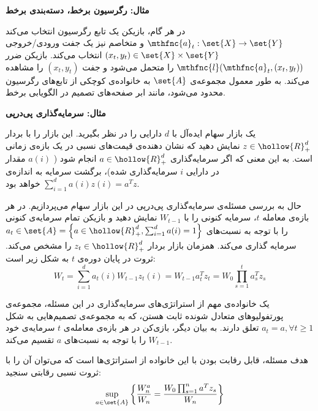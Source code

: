 {\bf
مثال: رگرسیون برخط، دسته‌بندی
برخط
} 

در هر گام، بازیکن یک تابع رگرسیون انتخاب می‌کند 
$\mthfnc{a}_t : \set{X} \rightarrow \set{Y}$ 
و متخاصم نیز یک جفت ورودی/خروجی 
$(x_t, y_t) \in \set{X} \times \set{Y}$ 
انتخاب می‌کند. بازیکن ضرر 
$\mthfnc{l}( \mthfnc{a}_t, (x_t, y_t) )$ 
را متحمل می‌شود و جفت 
$(x_t, y_t)$ 
را مشاهده می‌کند. به طور معمول مجموعه‌ی 
$\set{A}$ 
به خانواده‌ی کوچکی از تابع‌های رگرسیون محدود می‌شود، مانند ابر صفحه‌های تصمیم
در الگویابی
برخط.



{\bf
مثال: سرمایه‌گذاری پی‌درپی
} 

یک بازار سهام ایده‌آل
با 
$d$ 
دارایی
را در نظر بگیرید. این بازار را با بردار 
$z \in \hollow{R}^d_+$ 
نمایش دهید که نشان دهنده‌ی قیمت‌های نسبی در یک بازه‌ی زمانی است. به این معنی که اگر سرمایه‌گذاری 
$a \in \hollow{R}^d_+$ 
انجام شود ( 
$a(i)$ 
مقدار در دارایی 
$i$ 
سرمایه‌گذاری شده)، برگشت سرمایه به اندازه‌ی 
$ \sum^{d}_{i=1} a(i) z(i) = a^T z$ 
خواهد بود.

حال به بررسی مسئله‌ی سرمایه‌گذاری پی‌درپی در این بازار سهام می‌پردازیم. در هر بازه‌ی معامله 
$t$، 
سرمایه
کنونی را با 
$W_{t-1}$ 
نمایش دهید و بازیکن تمام سرمایه‌ی کنونی را با توجه به نسبت‌های 
$a_t \in \set{A} = \left\lbrace a \in \hollow{R}^d_+ , \sum^{d}_{i=1} a(i) = 1 \right\rbrace$ 
سرمایه گذاری می‌کند. همزمان بازار بردار 
$z_t \in \hollow{R}^d_+$ 
را مشخص می‌کند. ثروت در پایان دوره‌ی 
$t$ 
به شکل زیر است:
\[
W_t = \sum^{d}_{i=1} a_t (i) W_{t-1} z_t (i) = W_{t-1} a^T_t z_t = W_0 \prod^{t}_{s=1} a^T_s z_s
\]

یک خانواده‌ی مهم از استراتژی‌های سرمایه‌گذاری در این مسئله، مجموعه‌ی پورتفولیوهای متعادل شونده ثابت
هستن، که به مجموعه‌ی تصمیم‌هایی به شکل 
$a_t = a, \forall t \geq 1$ 
تعلق دارند. به بیان دیگر، بازی‌کن در هر بازه‌ی معامله‌ی 
$t$ 
سرمایه‌ی خود 
$W_{t-1}$ 
را با توجه به نسبت‌های 
$a$ 
تقسیم می‌کند.

هدف مسئله، قابل رقابت بودن با این خانواده از استراتژی‌ها است که می‌توان آن را با ثروت نسبی رقابتی
سنجید:
\[
\sup_{a \in \set{A}} \left\lbrace \frac{ W^a_n }{ W_n } = \frac{ W_0 \prod^{n}_{s=1} a^T z_s }{ W_n } \right\rbrace
\]

